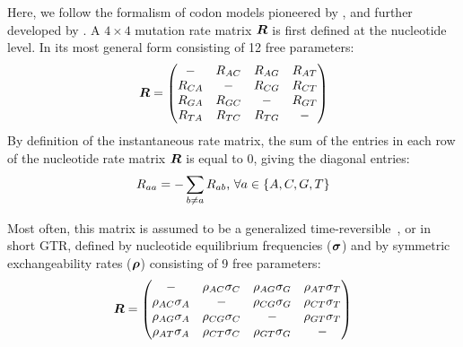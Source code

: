 Here, we follow the formalism of codon models pioneered by \citet{Muse1994}, and further developed by \citet{Nielsen1998}.
A $4 \times 4$ mutation rate matrix $\bm{R}$ is first defined at the nucleotide level.
In its most general form consisting of 12 free parameters:
\begin{equation}
    \label{eq:mutrates}
    \bm{R} =
    \begin{pmatrix}
        - & {R_{AC}} & {R_{AG}} & {R_{AT}} \\
        {R_{CA}} &                 - & {R_{CG}} & {R_{CT}} \\
        {R_{GA}} & {R_{GC}} &                 - & {R_{GT}} \\
        {R_{TA}} & {R_{TC}} & {R_{TG}} & -
    \end{pmatrix}
\end{equation}
By definition of the instantaneous rate matrix, the sum of the entries in each row of the nucleotide rate matrix $\bm{R}$ is equal to $0$, giving the diagonal entries:
\begin{equation}
    R_{aa} = - \sum\limits_{ b \neq a} R_{ab}\text{, } \forall a \in \{A,C,G,T\}
\end{equation}

Most often, this matrix is assumed to be a generalized time-reversible~\citep{Tavare1986}, or in short \acrshort{GTR}, defined by nucleotide equilibrium frequencies ($\bm{\sigma}$) and by symmetric exchangeability rates ($\bm{\rho}$) consisting of 9 free parameters:
\begin{equation}
    \label{eq:mutrates-GTR}
    \bm{R} =
    \begin{pmatrix}
        - & {\rho_{AC}\sigma_C} & {\rho_{AG}\sigma_G} & {\rho_{AT}\sigma_T} \\
        {\rho_{AC}\sigma_A} &                        - & {\rho_{CG}\sigma_G} & {\rho_{CT}\sigma_T} \\
        {\rho_{AG}\sigma_A} & {\rho_{CG}\sigma_C} &                        - & {\rho_{GT}\sigma_T} \\
        {\rho_{AT}\sigma_A} & {\rho_{CT}\sigma_C} & {\rho_{GT}\sigma_G} & -
    \end{pmatrix}
\end{equation}

